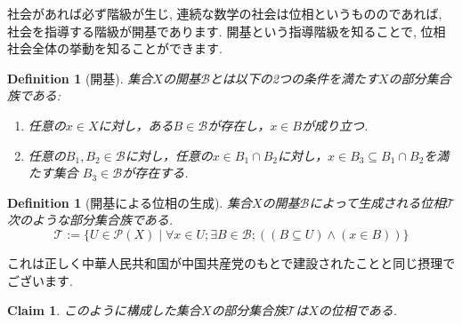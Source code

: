 \documentclass[dvipdfmx]{jbook}
\newtheorem{definition}[theorem]{Definition}
\newtheorem{claim}[theorem]{Claim}
\theoremstyle{remark}
\theoremstyle{plain}
\newcommand{\incfig}[1]{%
    \texttt{[image: ~/Documents/campus/math/eps/topology/1st/\#1.eps]}
}
\begin{document}
社会があれば必ず階級が生じ, 連続な数学の社会は位相というもののであれば, 社会を指導する階級が開基であります. 開基という指導階級を知ることで, 位相社会全体の挙動を知ることができます.

\begin{definition}[開基]
	集合$X$の開基$\mathcal{B}$とは以下の2つの条件を満たす$X$の部分集合族である:

	\begin{enumerate}
		\item 任意の$x \in X$に対し，ある$B \in \mathcal{B}$が存在し，$x \in B$が成り立つ.
		\item 任意の$B_1, B_2 \in \mathcal{B}$に対し，任意の$x \in B_1 \cap B_2$に対し，$x \in B_3 \subseteq B_1 \cap B_2$を満たす集合 $B_3 \in \mathcal{B}$が存在する.
	\end{enumerate}

\end{definition}
\begin{definition}[開基による位相の生成]\label{1}
	集合$X$の開基$\mathcal{B}$によって生成される位相$\mathcal{T}$次のような部分集合族である.
	$$
	\mathcal{T} := \{ U \in \mathcal{P}(X) \mid \forall x \in U ; \exists B \in \mathcal{B} ; \left( \left( B  \subseteq U \right) \land \left(x \in B \right) \right) \}
	$$
\end{definition}
これは正しく中華人民共和国が中国共産党のもとで建設されたことと同じ摂理でございます.
\begin{claim}
	このように構成した集合$X$の部分集合族$\mathcal{T}$は$X$の位相である.
\end{claim}
\end{document}
